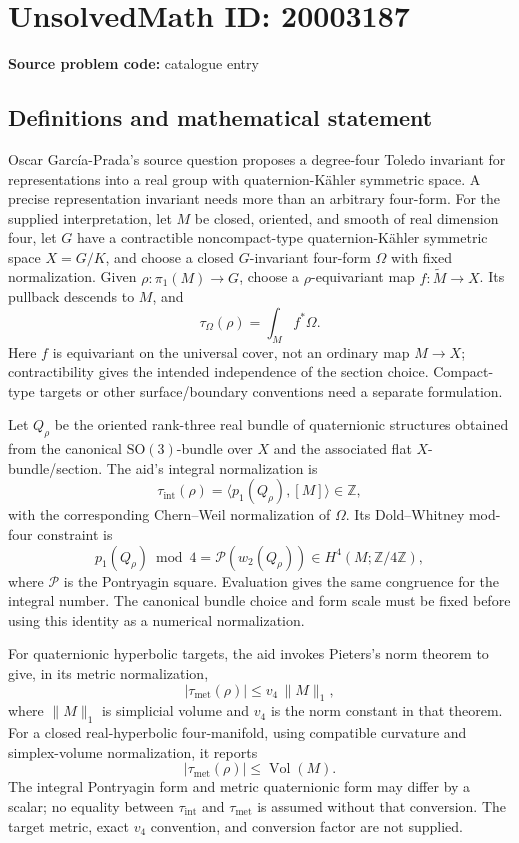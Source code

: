 \documentclass[11pt]{article}
\newcommand{\Z}{\mathbb{Z}}
\begin{document}
\section*{UnsolvedMath ID: 20003187}
\textbf{Source problem code:} catalogue entry
\subsection{Definitions and mathematical statement}
Oscar Garc\'ia-Prada's source question proposes a degree-four Toledo invariant for representations into a real group with quaternion-K\"ahler symmetric space. A precise representation invariant needs more than an arbitrary four-form. For the supplied interpretation, let \(M\) be closed, oriented, and smooth of real dimension four, let \(G\) have a contractible noncompact-type quaternion-K\"ahler symmetric space \(X=G/K\), and choose a closed \(G\)-invariant four-form \(\Omega\) with fixed normalization. Given \(\rho:\pi_1(M)\to G\), choose a \(\rho\)-equivariant map \(f:\widetilde M\to X\). Its pullback descends to \(M\), and
\[
 \tau_\Omega(\rho)=\int_M f^*\Omega.
\]
Here \(f\) is equivariant on the universal cover, not an ordinary map \(M\to X\); contractibility gives the intended independence of the section choice. Compact-type targets or other surface/boundary conventions need a separate formulation.

Let \(Q_\rho\) be the oriented rank-three real bundle of quaternionic structures obtained from the canonical \(\mathrm{SO}(3)\)-bundle over \(X\) and the associated flat \(X\)-bundle/section. The aid's integral normalization is
\[
 \tau_{\mathrm{int}}(\rho)=\langle p_1(Q_\rho),[M]\rangle\in\Z,
\]
with the corresponding Chern--Weil normalization of \(\Omega\). Its Dold--Whitney mod-four constraint is
\[
 p_1(Q_\rho)\bmod4=\mathcal P(w_2(Q_\rho))\in H^4(M;\Z/4\Z),
\]
where \(\mathcal P\) is the Pontryagin square. Evaluation gives the same congruence for the integral number. The canonical bundle choice and form scale must be fixed before using this identity as a numerical normalization.

For quaternionic hyperbolic targets, the aid invokes Pieters's norm theorem to give, in its metric normalization,
\[
 |\tau_{\mathrm{met}}(\rho)|\leq v_4\,\|M\|_1,
\]
where \(\|M\|_1\) is simplicial volume and \(v_4\) is the norm constant in that theorem. For a closed real-hyperbolic four-manifold, using compatible curvature and simplex-volume normalization, it reports
\[
 |\tau_{\mathrm{met}}(\rho)|\leq\operatorname{Vol}(M).
\]
The integral Pontryagin form and metric quaternionic form may differ by a scalar; no equality between \(\tau_{\mathrm{int}}\) and \(\tau_{\mathrm{met}}\) is assumed without that conversion. The target metric, exact \(v_4\) convention, and conversion factor are not supplied.
\end{document}
